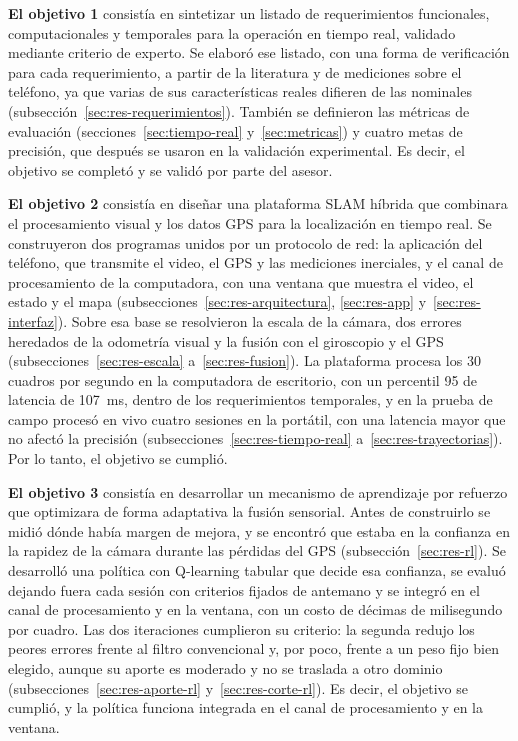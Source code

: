 \textbf{El objetivo 1} consistía en sintetizar un listado de requerimientos funcionales, computacionales y temporales para la operación en tiempo real, validado mediante criterio de experto.
Se elaboró ese listado, con una forma de verificación para cada requerimiento, a partir de la literatura y de mediciones sobre el teléfono, ya que varias de sus características reales difieren de las nominales (subsección~\ref{sec:res-requerimientos}).
También se definieron las métricas de evaluación (secciones~\ref{sec:tiempo-real} y~\ref{sec:metricas}) y cuatro metas de precisión, que después se usaron en la validación experimental.
Es decir, el objetivo se completó y se validó por parte del asesor.

\textbf{El objetivo 2} consistía en diseñar una plataforma SLAM híbrida que combinara el procesamiento visual y los datos GPS para la localización en tiempo real.
Se construyeron dos programas unidos por un protocolo de red: la aplicación del teléfono, que transmite el video, el GPS y las mediciones inerciales, y el canal de procesamiento de la computadora, con una ventana que muestra el video, el estado y el mapa (subsecciones~\ref{sec:res-arquitectura}, \ref{sec:res-app} y~\ref{sec:res-interfaz}).
Sobre esa base se resolvieron la escala de la cámara, dos errores heredados de la odometría visual y la fusión con el giroscopio y el GPS (subsecciones~\ref{sec:res-escala} a~\ref{sec:res-fusion}).
La plataforma procesa los 30 cuadros por segundo en la computadora de escritorio, con un percentil 95 de latencia de 107~ms, dentro de los requerimientos temporales, y en la prueba de campo procesó en vivo cuatro sesiones en la portátil, con una latencia mayor que no afectó la precisión (subsecciones~\ref{sec:res-tiempo-real} a~\ref{sec:res-trayectorias}).
Por lo tanto, el objetivo se cumplió.

\textbf{El objetivo 3} consistía en desarrollar un mecanismo de aprendizaje por refuerzo que optimizara de forma adaptativa la fusión sensorial.
Antes de construirlo se midió dónde había margen de mejora, y se encontró que estaba en la confianza en la rapidez de la cámara durante las pérdidas del GPS (subsección~\ref{sec:res-rl}).
Se desarrolló una política con Q-learning tabular que decide esa confianza, se evaluó dejando fuera cada sesión con criterios fijados de antemano y se integró en el canal de procesamiento y en la ventana, con un costo de décimas de milisegundo por cuadro.
Las dos iteraciones cumplieron su criterio: la segunda redujo los peores errores frente al filtro convencional y, por poco, frente a un peso fijo bien elegido, aunque su aporte es moderado y no se traslada a otro dominio (subsecciones~\ref{sec:res-aporte-rl} y~\ref{sec:res-corte-rl}).
Es decir, el objetivo se cumplió, y la política funciona integrada en el canal de procesamiento y en la ventana.

